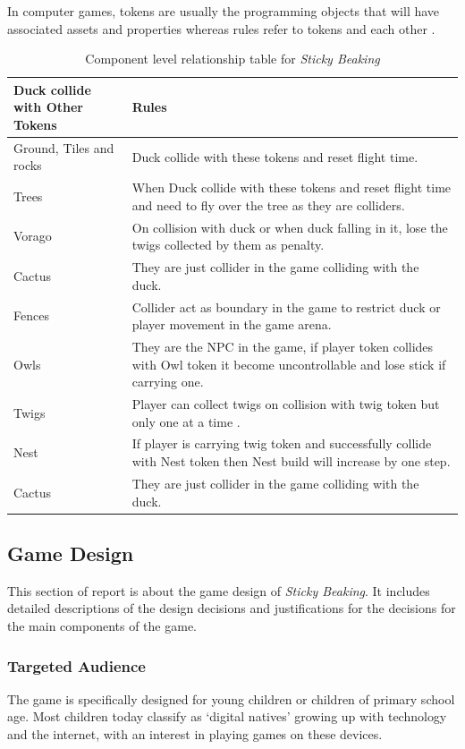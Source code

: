 \documentclass[12pt]{article}
\newcommand{\game}[2]{\textit{#1}}{}
\begin{document}
In computer games, tokens are usually the programming objects that will have associated assets and properties whereas rules refer to tokens and each other \cite{funandgameplay}. 
\begin{table}[H]
\centering
\begin{tabular}{| p{6cm} | p{6cm} |}
  \hline
     \bf Duck collide with Other Tokens  & \bf Rules\\ \hline
     Ground, Tiles and rocks & Duck collide with these tokens and reset flight time. \\ \hline
    Trees & When Duck collide with these tokens and reset flight time and need to fly over the tree as they are colliders. \\ \hline
    Vorago & On collision with duck or when duck falling in it, lose the twigs collected by them as penalty.  \\ \hline
    Cactus & They are just collider in the game colliding with the duck.  \\ \hline
    Fences & Collider act as boundary in the game  to restrict duck or player movement in the game arena.  \\ \hline
    Owls & They are the NPC in the game, if player token collides with Owl token it become uncontrollable and lose stick if carrying one.  \\ \hline
    Twigs & Player can collect twigs on collision with twig token but only one at a time .  \\ \hline
    Nest & If player is carrying twig token and successfully collide with Nest token then Nest build will increase by one step.  \\ \hline
    Cactus & They are just collider in the game colliding with the duck.  \\ \hline
\end{tabular}
\caption{Component level relationship table for \game{Sticky Beaking}{}}
\label{tab:comprelationship}
\end{table}

\subsection{Game Design}

This section of report is about the game design of \game{Sticky Beaking}{}. It includes detailed descriptions of the design decisions and justifications for the decisions for the main components of the game.

\subsubsection{Targeted Audience }
The game is specifically designed for young children or children of primary school age. Most children today classify as `digital natives' \cite{helsper} growing up with technology and the internet, with an interest in playing games on these devices. 
\end{document}

